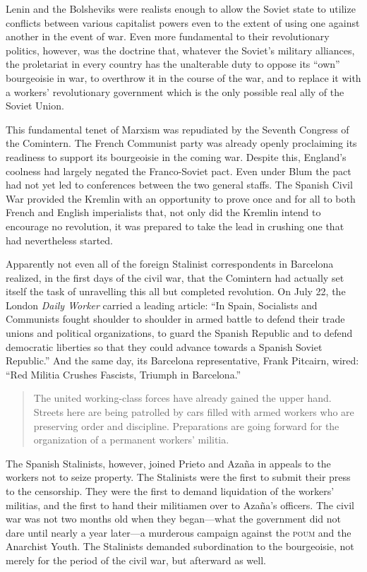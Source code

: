 Lenin and the Bolsheviks were realists enough to allow the Soviet state to utilize conflicts between various capitalist powers even to the extent of using one against another in the event of war. Even more fundamental to their revolutionary politics, however, was the doctrine that, whatever the Soviet’s military alliances, the proletariat in every country has the unalterable duty to oppose its ``own'' bourgeoisie in war, to overthrow it in the course of the war, and to replace it with a workers’ revolutionary government which is the only possible real ally of the Soviet Union.

This fundamental tenet of Marxism was repudiated by the Seventh Congress of the Comintern. The French Communist party was already openly proclaiming its readiness to support its bourgeoisie in the coming war. Despite this, England’s coolness had largely negated the Franco-Soviet pact. Even under Blum the pact had not yet led to conferences between the two general staffs. The Spanish Civil War provided the Kremlin with an opportunity to prove once and for all to both French and English imperialists that, not only did the Kremlin intend to encourage no revolution, it was prepared to take the lead in crushing one that had nevertheless started.

Apparently not even all of the foreign Stalinist correspondents in Barcelona realized, in the first days of the civil war, that the Comintern had actually set itself the task of unravelling this all but completed revolution. On July 22, the London \emph{Daily Worker} carried a leading article: ``In Spain, Socialists and Communists fought shoulder to shoulder in armed battle to defend their trade unions and political organizations, to guard the Spanish Republic and to defend democratic liberties so that they could advance towards a Spanish Soviet Republic.'' And the same day, its Barcelona representative, Frank Pitcairn, wired: ``Red Militia Crushes Fascists, Triumph in Barcelona.''

\begin{quotation}
  The united working-class forces have already gained the upper hand. Streets here are being patrolled by cars filled with armed workers who are preserving order and discipline. Preparations are going forward for the organization of a permanent workers’ militia.
\end{quotation}

The Spanish Stalinists, however, joined Prieto and Azaña in appeals to the workers not to seize property. The Stalinists were the first to submit their press to the censorship. They were the first to demand liquidation of the workers’ militias, and the first to hand their militiamen over to Azaña’s officers. The civil war was not two months old when they began---what the government did not dare until nearly a year later---a murderous campaign against the \textsc{poum} and the Anarchist Youth. The Stalinists demanded subordination to the bourgeoisie, not merely for the period of the civil war, but afterward as well.

